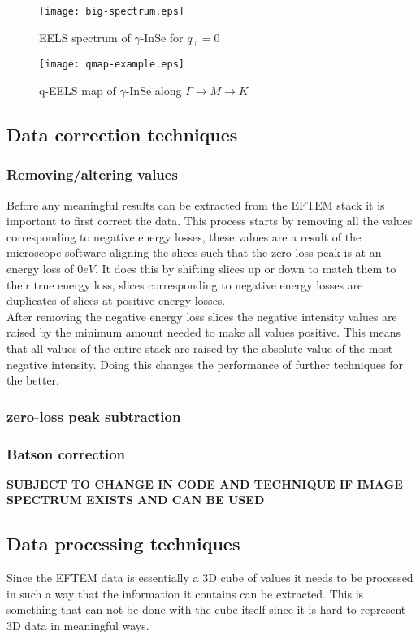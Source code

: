 \begin{figure}
	\centering
	\texttt{[image: big-spectrum.eps]}
	\caption{EELS spectrum of $\gamma$-InSe for $q_{\perp}=0$}
	\label{fig:spectrum}
\end{figure}

\begin{figure}
	\centering
	\texttt{[image: qmap-example.eps]}
	\caption{q-EELS map of $\gamma$-InSe along $\Gamma \rightarrow M \rightarrow K$}
	\label{fig:qmap}
\end{figure}


\subsection{Data correction techniques}
\subsubsection{Removing/altering values}
Before any meaningful results can be extracted from the EFTEM stack it is important to first correct the data.
This process starts by removing all the values corresponding to negative energy losses, these values are a result of the microscope software aligning the slices such that the zero-loss peak is at an energy loss of $0eV$.
It does this by shifting slices up or down to match them to their true energy loss, slices corresponding to negative energy losses are duplicates of slices at positive energy losses.\\
After removing the negative energy loss slices the negative intensity values are raised by the minimum amount needed to make all values positive.
This means that all values of the entire stack are raised by the absolute value of the most negative intensity. Doing this changes the performance of further techniques for the better.

\subsubsection{zero-loss peak subtraction}



\subsubsection{Batson correction}
\textbf{SUBJECT TO CHANGE IN CODE AND TECHNIQUE IF IMAGE SPECTRUM EXISTS AND CAN BE USED}


\subsection{Data processing techniques}
Since the EFTEM data is essentially a 3D cube of values it needs to be processed in such a way that the information it contains can be extracted. This is something that can not be done with the cube itself since it is hard to represent 3D data in meaningful ways.


